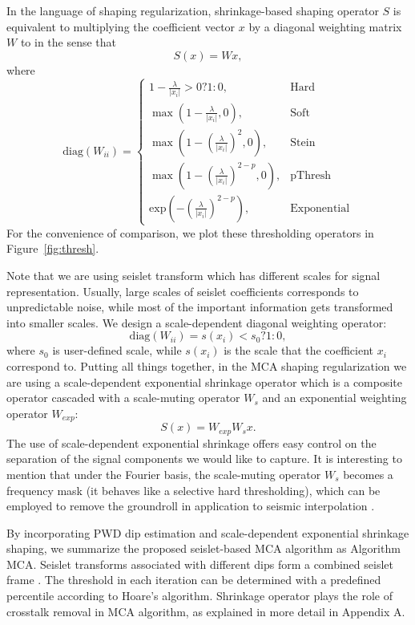  In the language of shaping regularization, shrinkage-based shaping operator $S$ is equivalent to multiplying the coefficient vector $x$ by a diagonal weighting matrix $W$ to in the sense that
\begin{equation}
 S(x)=Wx,
\end{equation}
where 
\begin{equation}
 \mathrm{diag}(W_{ii})=
 \begin{cases}
 1-\frac{\lambda}{|x_i|}>0?1:0, & \mathrm{Hard}\\
 \max(1-\frac{\lambda}{|x_i|},0), & \mathrm{Soft}\\
 \max(1-\left(\frac{\lambda}{|x_i|}\right)^2,0), & \mathrm{Stein}\\
 \max(1-\left(\frac{\lambda}{|x_i|}\right)^{2-p},0), & \mathrm{pThresh}\\
 \mathrm{exp}(-(\frac{\lambda}{|x_i|})^{2-p}),& \mathrm{Exponential}
 \end{cases}
\end{equation}
For the convenience of comparison, we plot these thresholding operators in Figure~\ref{fig:thresh}. 


Note that we are using seislet transform which has different scales for signal representation. Usually, large scales of seislet coefficients corresponds to unpredictable noise, while most of the important information gets transformed into smaller scales. We design a scale-dependent diagonal weighting operator:
\begin{equation}
 \mathrm{diag}(W_{ii})= s(x_i)<s_0?1:0,
\end{equation}
where $s_0$ is user-defined scale, while $s(x_i)$ is the scale that the coefficient $x_i$ correspond to.  Putting all things together, in the MCA shaping regularization we are using a scale-dependent exponential shrinkage operator which is a composite operator cascaded with a scale-muting operator $W_{s}$ and an exponential weighting operator $W_{exp}$:
\begin{equation}
 S(x)=W_{exp} W_s x.
\end{equation}
The use of scale-dependent exponential shrinkage offers easy control on the separation of the signal components we would like to capture. It is interesting to mention that under the Fourier basis, the scale-muting operator $W_s$ becomes a frequency mask (it behaves like a selective hard thresholding), which can be employed to remove the groundroll in application to seismic interpolation \citep{gholami2014non}.


By incorporating PWD dip estimation and scale-dependent exponential shrinkage shaping, we summarize the proposed seislet-based MCA algorithm as Algorithm MCA. Seislet transforms associated with different dips form a combined seislet frame \citep{fomel2010seislet}. The threshold in each iteration can be determined with a predefined percentile according to Hoare's algorithm. Shrinkage operator plays the role of crosstalk removal in MCA algorithm, as explained in more detail in Appendix A.




